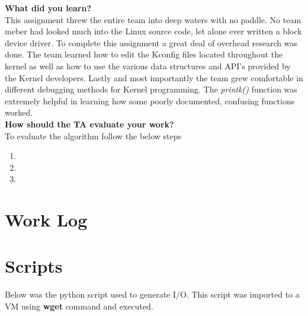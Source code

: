 \documentclass[10pt,onecolumn,draftclsnofoot]{IEEEtran} %
\begin{document}
\begin{singlespace}
        \textbf{What did you learn?}\\
        \normalfont \indent This assignment threw the entire team into deep waters with no paddle. No team meber had looked much into the Linux source code, let alone ever written a block device driver. To complete this assignment a great deal of overhead research was done. The team learned how to edit the Kconfig files located throughout the kernel as well as how to use the various data structures and API's provided by the Kernel developers. Lastly and most importantly the team grew comfortable in different debugging methods for Kernel programming. The \textit{printk()} function was extremely helpful in learning how some poorly documented, confusing functions worked.\\

        \textbf{How should the TA evaluate your work?}\\
        \normalfont \indent To evaluate the algorithm follow the below steps
        \begin{enumerate}
                \item
                \item
                \item
        \end{enumerate}

\newpage
\section{\bf Work Log}

                

\newpage


\section{\bf Scripts}
\normalfont \indent Below was the python script used to generate I/O. This script was imported to a VM using \textbf{wget} command and executed.




\end{singlespace}
\restoregeometry
\end{document}
